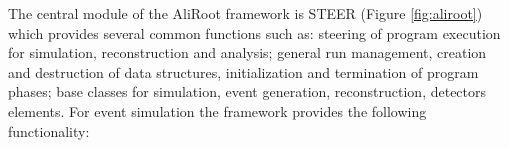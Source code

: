 The central module of the AliRoot framework is STEER (Figure \ref{fig:aliroot}) which provides several common functions such as: steering of program execution for simulation, reconstruction and analysis; general run management, creation and destruction of data structures, initialization and termination of program phases; base classes for simulation, event generation, reconstruction, detectors elements.
For event simulation the framework provides the following functionality:

\newpage
